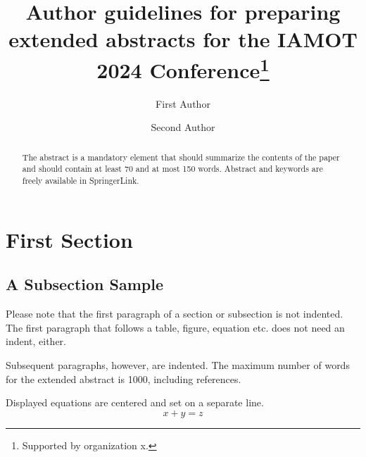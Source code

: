 \documentclass[runningheads]{llncs}
\begin{document}
%
\title{Author guidelines for preparing extended abstracts for the IAMOT 2024 Conference\thanks{Supported by organization x.}}
%
%
\author{First Author \and
Second Author}
%
%
%
\maketitle              %
%
\begin{abstract}
The abstract is a mandatory element that should summarize the contents of the paper and should contain at least 70 and at most 150 words. Abstract and keywords are freely available in SpringerLink. 

\end{abstract}
%
%
%
\section{First Section}
\subsection{A Subsection Sample}
Please note that the first paragraph of a section or subsection is
not indented. The first paragraph that follows a table, figure,
equation etc. does not need an indent, either.

Subsequent paragraphs, however, are indented. The maximum number of words for the extended abstract is 1000, including references.

\noindent Displayed equations are centered and set on a separate
line.
\begin{equation}
x + y = z
\end{equation}
\end{document}
